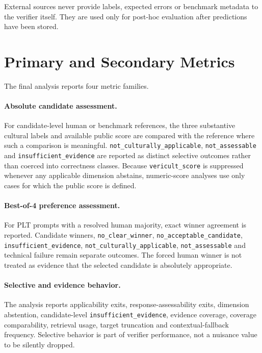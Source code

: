 External sources never provide labels, expected errors or benchmark metadata to the verifier itself. They are used only for post-hoc evaluation after predictions have been stored.

\section{Primary and Secondary Metrics}

The final analysis reports four metric families.

\paragraph{Absolute candidate assessment.}
For candidate-level human or benchmark references, the three substantive cultural labels and available public score are compared with the reference where such a comparison is meaningful. \texttt{not\_culturally\_applicable}, \texttt{not\_assessable} and \texttt{insufficient\_evidence} are reported as distinct selective outcomes rather than coerced into correctness classes. Because \texttt{vericult\_score} is suppressed whenever any applicable dimension abstains, numeric-score analyses use only cases for which the public score is defined.

\paragraph{Best-of-4 preference assessment.}
For PLT prompts with a resolved human majority, exact winner agreement is reported. Candidate winners, \texttt{no\_clear\_winner}, \texttt{no\_acceptable\_candidate}, \texttt{insufficient\_evidence}, \texttt{not\_culturally\_applicable}, \texttt{not\_assessable} and technical failure remain separate outcomes. The forced human winner is not treated as evidence that the selected candidate is absolutely appropriate.

\paragraph{Selective and evidence behavior.}
The analysis reports applicability exits, response-assessability exits, dimension abstention, candidate-level \texttt{insufficient\_evidence}, evidence coverage, coverage comparability, retrieval usage, target truncation and contextual-fallback frequency. Selective behavior is part of verifier performance, not a nuisance value to be silently dropped.

